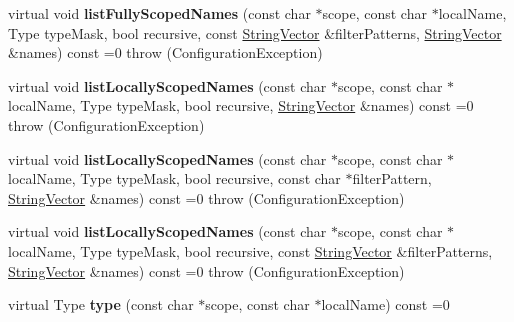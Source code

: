 \begin{DoxyCompactItemize}
\item 
\hypertarget{classCONFIG4CPP__NAMESPACE_1_1Configuration_ae00584fdb96a5d9157e3dadc3abd58c4}{virtual void {\bfseries list\-Fully\-Scoped\-Names} (const char $\ast$scope, const char $\ast$local\-Name, Type type\-Mask, bool recursive, const \hyperlink{classCONFIG4CPP__NAMESPACE_1_1StringVector}{String\-Vector} \&filter\-Patterns, \hyperlink{classCONFIG4CPP__NAMESPACE_1_1StringVector}{String\-Vector} \&names) const =0  throw (\-Configuration\-Exception)}\label{classCONFIG4CPP__NAMESPACE_1_1Configuration_ae00584fdb96a5d9157e3dadc3abd58c4}

\item 
\hypertarget{classCONFIG4CPP__NAMESPACE_1_1Configuration_ab8db65ad603a5fe0fb024c7fdd20b934}{virtual void {\bfseries list\-Locally\-Scoped\-Names} (const char $\ast$scope, const char $\ast$local\-Name, Type type\-Mask, bool recursive, \hyperlink{classCONFIG4CPP__NAMESPACE_1_1StringVector}{String\-Vector} \&names) const =0  throw (\-Configuration\-Exception)}\label{classCONFIG4CPP__NAMESPACE_1_1Configuration_ab8db65ad603a5fe0fb024c7fdd20b934}

\item 
\hypertarget{classCONFIG4CPP__NAMESPACE_1_1Configuration_a1b2525a187ee91637a47088acc92e090}{virtual void {\bfseries list\-Locally\-Scoped\-Names} (const char $\ast$scope, const char $\ast$local\-Name, Type type\-Mask, bool recursive, const char $\ast$filter\-Pattern, \hyperlink{classCONFIG4CPP__NAMESPACE_1_1StringVector}{String\-Vector} \&names) const =0  throw (\-Configuration\-Exception)}\label{classCONFIG4CPP__NAMESPACE_1_1Configuration_a1b2525a187ee91637a47088acc92e090}

\item 
\hypertarget{classCONFIG4CPP__NAMESPACE_1_1Configuration_a5e72ebf192e21763966cda00def37d3f}{virtual void {\bfseries list\-Locally\-Scoped\-Names} (const char $\ast$scope, const char $\ast$local\-Name, Type type\-Mask, bool recursive, const \hyperlink{classCONFIG4CPP__NAMESPACE_1_1StringVector}{String\-Vector} \&filter\-Patterns, \hyperlink{classCONFIG4CPP__NAMESPACE_1_1StringVector}{String\-Vector} \&names) const =0  throw (\-Configuration\-Exception)}\label{classCONFIG4CPP__NAMESPACE_1_1Configuration_a5e72ebf192e21763966cda00def37d3f}

\item 
\hypertarget{classCONFIG4CPP__NAMESPACE_1_1Configuration_a54699fc992061b0521fad2df4d6dfaff}{virtual Type {\bfseries type} (const char $\ast$scope, const char $\ast$local\-Name) const =0}\label{classCONFIG4CPP__NAMESPACE_1_1Configuration_a54699fc992061b0521fad2df4d6dfaff}


\end{DoxyCompactItemize}
